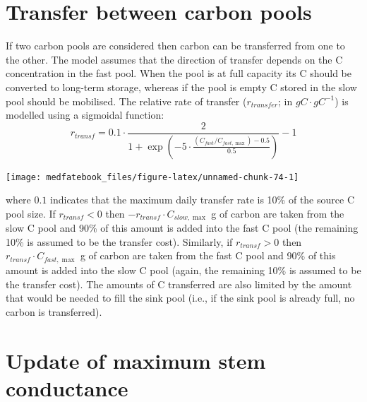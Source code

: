 \documentclass[]{book}
\begin{document}
\hypertarget{transfer-between-carbon-pools}{%
\section{Transfer between carbon pools}\label{transfer-between-carbon-pools}}

If two carbon pools are considered then carbon can be transferred from one to the other. The model assumes that the direction of transfer depends on the C concentration in the fast pool. When the pool is at full capacity its C should be converted to long-term storage, whereas if the pool is empty C stored in the slow pool should be mobilised. The relative rate of transfer (\(r_{transfer}\); in \(g C·g C^{-1}\)) is modelled using a sigmoidal function:
\begin{equation}
r_{transf} = 0.1 \cdot \frac{2}{1+\exp \left(-5 \cdot \frac{(C_{fast}/C_{fast, \max})-0.5}{0.5}\right)}-1
\end{equation}

\begin{center}\texttt{[image: medfatebook\_files/figure-latex/unnamed-chunk-74-1]} \end{center}

where \(0.1\) indicates that the maximum daily transfer rate is 10\% of the source C pool size. If \(r_{transf}<0\) then \(-r_{transf} \cdot C_{slow, \max}\) g of carbon are taken from the slow C pool and 90\% of this amount is added into the fast C pool (the remaining 10\% is assumed to be the transfer cost). Similarly, if \(r_{transf}>0\) then \(r_{transf} \cdot C_{fast, \max}\) g of carbon are taken from the fast C pool and 90\% of this amount is added into the slow C pool (again, the remaining 10\% is assumed to be the transfer cost). The amounts of C transferred are also limited by the amount that would be needed to fill the sink pool (i.e., if the sink pool is already full, no carbon is transferred).

\hypertarget{update-of-maximum-stem-conductance}{%
\section{Update of maximum stem conductance}\label{update-of-maximum-stem-conductance}}
\end{document}
